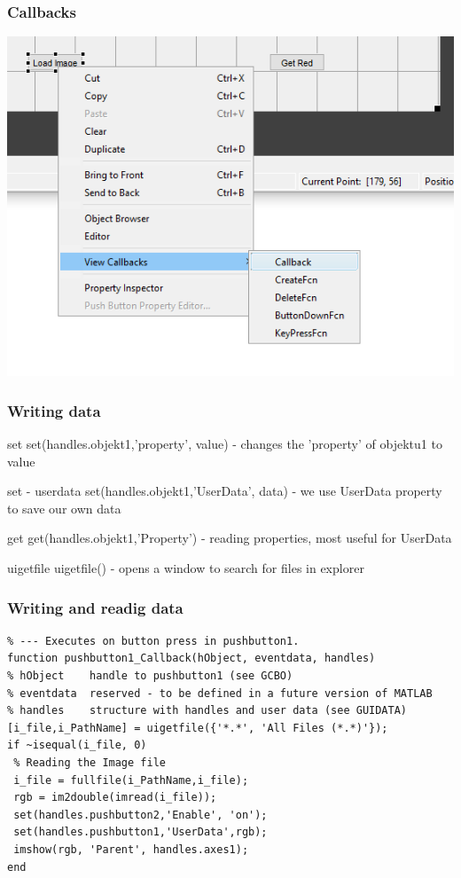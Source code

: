 \documentclass{beamer}
\begin{document}
\begin{frame}
  \frametitle{Callbacks}
  \centering
  \includegraphics[width=\textwidth, height=0.8\textheight,keepaspectratio]{screens/callbacks.png}
\end{frame}

\begin{frame}
  \frametitle{Writing data}
  \begin{block}{set}
  set(handles.objekt1,'property', value) - changes the 'property' of objektu1 to value
 \end{block}
 
   \begin{block}{set - userdata}
  set(handles.objekt1,'UserData', data) - we use UserData property to save our own data
 \end{block}
 
   \begin{block}{get}
  get(handles.objekt1,'Property') - reading properties, most useful for UserData
 \end{block}

   \begin{block}{uigetfile}
  uigetfile() - opens a window to search for files in explorer
 \end{block}
\end{frame}

\begin{frame}[fragile]
  \frametitle{Writing and readig data}
  \begin{verbatim}
% --- Executes on button press in pushbutton1.
function pushbutton1_Callback(hObject, eventdata, handles)
% hObject    handle to pushbutton1 (see GCBO)
% eventdata  reserved - to be defined in a future version of MATLAB
% handles    structure with handles and user data (see GUIDATA)
[i_file,i_PathName] = uigetfile({'*.*', 'All Files (*.*)'});
if ~isequal(i_file, 0)
 % Reading the Image file
 i_file = fullfile(i_PathName,i_file);
 rgb = im2double(imread(i_file));
 set(handles.pushbutton2,'Enable', 'on');
 set(handles.pushbutton1,'UserData',rgb);
 imshow(rgb, 'Parent', handles.axes1);
end \end{verbatim}
\end{frame}
\end{document}
